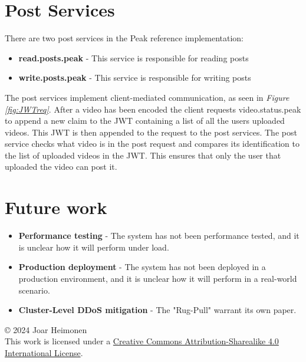 \documentclass[12pt]{article}
\newcommand{\license}{
    \vspace{1em}
    \noindent\small{© 2024 Joar Heimonen\\
    This work is licensed under a \href{https://creativecommons.org/licenses/by-sa/4.0/}{Creative Commons Attribution-Sharealike 4.0 International License}.}
    \vspace{1em}
}
\begin{document}
\section{Post Services}
There are two post services in the Peak reference implementation:
\begin{itemize}
    \item \textbf{read.posts.peak} - This service is responsible for reading posts
    \item \textbf{write.posts.peak} - This service is responsible for writing posts
\end{itemize}
The post services implement client-mediated communication, as seen in \textit{Figure \ref{fig:JWTreq}}.
After a video has been encoded the client requests video.status.peak to append a new claim to the JWT 
containing a list of all the users uploaded videos. This JWT is then appended to the request to the post services.
The post service checks what video is in the post request and compares its identification to the list of uploaded videos in the JWT.
This ensures that only the user that uploaded the video can post it.

\section{Future work}
\begin{itemize}
    \item \textbf{Performance testing} - The system has not been performance tested, and it is unclear how it will perform under load.
    \item \textbf{Production deployment} - The system has not been deployed in a production environment, and it is unclear how it will perform in a real-world scenario.
    \item \textbf{Cluster-Level DDoS mitigation} - The "Rug-Pull" warrant its own paper.
\end{itemize}

\pagebreak
{}
\printbibliography
\license
\end{document}
